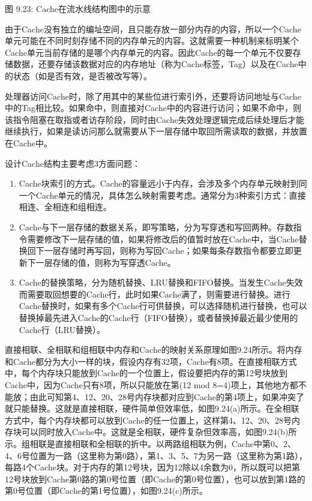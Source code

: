 \documentclass[]{ctexbook}
\providecommand{\tightlist}{%
  \setlength{\itemsep}{0pt}\setlength{\parskip}{0pt}}
\begin{document}
图 9.23: Cache在流水线结构图中的示意

由于Cache没有独立的编址空间，且只能存放一部分内存的内容，所以一个Cache单元可能在不同时刻存储不同的内存单元的内容。这就需要一种机制来标明某个Cache单元当前存储的是哪个内存单元的内容。因此Cache的每一个单元不仅要存储数据，还要存储该数据对应的内存地址（称为Cache标签，Tag）以及在Cache中的状态（如是否有效，是否被改写等）。

处理器访问Cache时，除了用其中的某些位进行索引外，还要将访问地址与Cache中的Tag相比较。如果命中，则直接对Cache中的内容进行访问；如果不命中，则该指令阻塞在取指或者访存阶段，同时由Cache失效处理逻辑完成后续处理后才能继续执行，如果是读访问那么就需要从下一层存储中取回所需读取的数据，并放置在Cache中。

设计Cache结构主要考虑3方面问题：

\begin{enumerate}
\def\labelenumi{\arabic{enumi})}
\tightlist
\item
  Cache块索引的方式。Cache的容量远小于内存，会涉及多个内存单元映射到同一个Cache单元的情况，具体怎么映射需要考虑。通常分为3种索引方式：直接相连、全相连和组相连。
\item
  Cache与下一层存储的数据关系，即写策略，分为写穿透和写回两种。存数指令需要修改下一层存储的值，如果将修改后的值暂时放在Cache中，当Cache替换回下一层存储时再写回，则称为写回Cache；如果每条存数指令都要立即更新下一层存储的值，则称为写穿透Cache。
\item
  Cache的替换策略，分为随机替换、LRU替换和FIFO替换。当发生Cache失效而需要取回想要的Cache行，此时如果Cache满了，则需要进行替换。进行Cache替换时，如果有多个Cache行可供替换，可以选择随机进行替换，也可以替换掉最先进入Cache的Cache行（FIFO替换），或者替换掉最近最少使用的Cache行（LRU替换）。
\end{enumerate}

直接相联、全相联和组相联中内存和Cache的映射关系原理如图9.24所示。将内存和Cache都分为大小一样的块，假设内存有32项，Cache有8项。在直接相联方式中，每个内存块只能放到Cache的一个位置上，假设要把内存的第12号块放到Cache中，因为Cache只有8项，所以只能放在第(12 mod 8=4)项上，其他地方都不能放；由此可知第4、12、20、28号内存块都对应到Cache的第4项上，如果冲突了就只能替换。这就是直接相联，硬件简单但效率低，如图9.24(a)所示。在全相联方式中，每个内存块都可以放到Cache的任一位置上，这样第4、12、20、28号内存块可以同时放入Cache中。这就是全相联，硬件复杂但效率高，如图9.24(b)所示。组相联是直接相联和全相联的折中。以两路组相联为例，Cache中第0、2、4、6号位置为一路（这里称为第0路），第1、3、5、7为另一路（这里称为第1路），每路4个Cache块。对于内存的第12号块，因为12除以4余数为0，所以既可以把第12号块放到Cache第0路的第0号位置（即Cache的第0号位置），也可以放到第1路的第0号位置（即Cache的第1号位置），如图9.24(c)所示。
\end{document}

